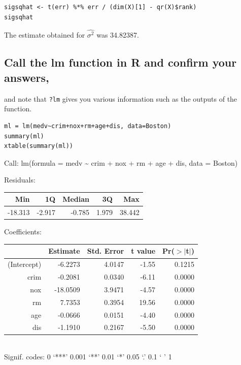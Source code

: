 \documentclass[11pt]{article}
\begin{document}
\begin{verbatim}
sigsqhat <- t(err) %*% err / (dim(X)[1] - qr(X)$rank)
sigsqhat
\end{verbatim}

The estimate obtained for $\hat{\sigma^2}$ was 34.82387.
\subsection{Call the lm function in R and confirm your answers,}
\label{sec-4-7}

and note that \verb~?lm~ gives you various information such as the outputs
of the function.


\begin{verbatim}
ml = lm(medv~crim+nox+rm+age+dis, data=Boston)
summary(ml)
xtable(summary(ml))
\end{verbatim}


Call:
lm(formula = medv \~{} crim + nox + rm + age + dis, data = Boston)

\begin{table}[ht]
\centering
Residuals:\\
\begin{tabular}{rrrrr}
\hline
    Min   &   1Q &   Median &      3Q  &     Max\\
\hline 
-18.313  & -2.917 &  -0.785 &   1.979 &  38.442 \\
\hline
\end{tabular}
\end{table}

\begin{table}[ht]
\centering
Coefficients:\\
\begin{tabular}{rrrrr}
  \hline
 & Estimate & Std. Error & t value & Pr($>$$|$t$|$) \\ 
  \hline
(Intercept) & -6.2273 & 4.0147 & -1.55 & 0.1215 \\ 
  crim & -0.2081 & 0.0340 & -6.11 & 0.0000 \\ 
  nox & -18.0509 & 3.9471 & -4.57 & 0.0000 \\ 
  rm & 7.7353 & 0.3954 & 19.56 & 0.0000 \\ 
  age & -0.0666 & 0.0151 & -4.40 & 0.0000 \\ 
  dis & -1.1910 & 0.2167 & -5.50 & 0.0000 \\ 
   \hline
\end{tabular}\\
Signif. codes:  0 ‘***’ 0.001 ‘**’ 0.01 ‘*’ 0.05 ‘.’ 0.1 ‘ ’ 1
\end{table}
\end{document}
